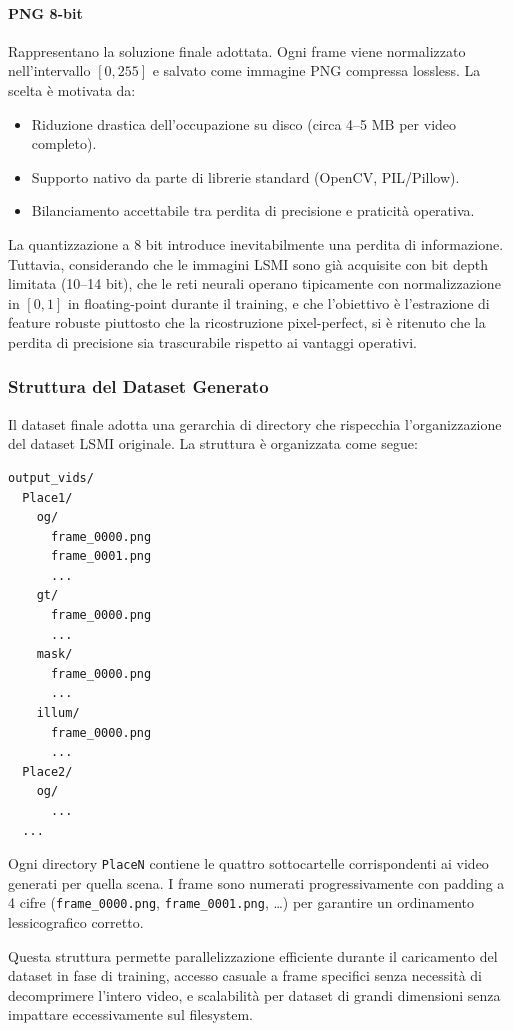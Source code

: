 \paragraph{PNG 8-bit}
Rappresentano la soluzione finale adottata. Ogni frame viene normalizzato nell'intervallo $[0, 255]$ e salvato come immagine PNG compressa lossless. La scelta è motivata da:
\begin{itemize}
    \item Riduzione drastica dell'occupazione su disco (circa 4--5 MB per video completo).
    \item Supporto nativo da parte di librerie standard (OpenCV, PIL/Pillow).
    \item Bilanciamento accettabile tra perdita di precisione e praticità operativa.
\end{itemize}

La quantizzazione a 8 bit introduce inevitabilmente una perdita di informazione. Tuttavia, considerando che le immagini LSMI sono già acquisite con bit depth limitata (10--14 bit), che le reti neurali operano tipicamente con normalizzazione in $[0, 1]$ in floating-point durante il training, e che l'obiettivo è l'estrazione di feature robuste piuttosto che la ricostruzione pixel-perfect, si è ritenuto che la perdita di precisione sia trascurabile rispetto ai vantaggi operativi.

\subsubsection{Struttura del Dataset Generato}
Il dataset finale adotta una gerarchia di directory che rispecchia l'organizzazione del dataset LSMI originale. La struttura è organizzata come segue:

\begin{verbatim}
output_vids/
  Place1/
    og/
      frame_0000.png
      frame_0001.png
      ...
    gt/
      frame_0000.png
      ...
    mask/
      frame_0000.png
      ...
    illum/
      frame_0000.png
      ...
  Place2/
    og/
      ...
  ...
\end{verbatim}

Ogni directory \texttt{PlaceN} contiene le quattro sottocartelle corrispondenti ai video generati per quella scena. I frame sono numerati progressivamente con padding a 4 cifre (\texttt{frame\_0000.png}, \texttt{frame\_0001.png}, \ldots) per garantire un ordinamento lessicografico corretto.

Questa struttura permette parallelizzazione efficiente durante il caricamento del dataset in fase di training, accesso casuale a frame specifici senza necessità di decomprimere l'intero video, e scalabilità per dataset di grandi dimensioni senza impattare eccessivamente sul filesystem.

